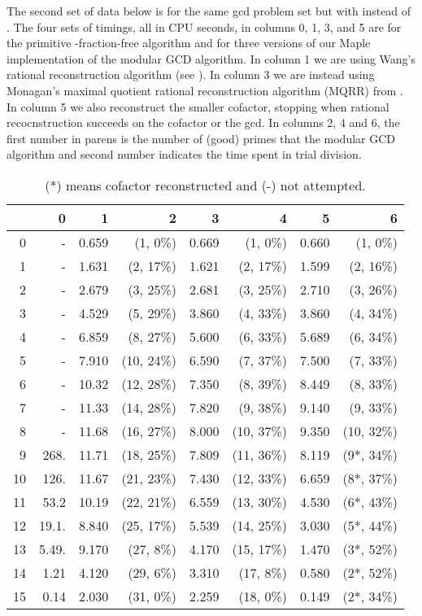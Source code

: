 \documentclass[10pt]{article}
\begin{document}
The second set of data below is for the same gcd problem set but
with  instead of . The four sets of timings, all in CPU
seconds, in columns 0, 1, 3, and 5 are for the primitive
-fraction-free algorithm and for three versions of our Maple
implementation of the modular GCD algorithm. In column 1 we are
using Wang's rational reconstruction algorithm (see \cite{Wang81}).
In column 3 we are instead using Monagan's maximal quotient rational
reconstruction algorithm (MQRR) from \cite{MQRR}. In column 5 we
also reconstruct the smaller cofactor, stopping when rational
recocnstruction succeeds on the cofactor or the gcd. In columns 2, 4
and 6, the first number in parens is the number of (good) primes
that the modular GCD algorithm and second number indicates the time
spent in trial division.

\begin{table}[htb]
\begin{center}
\begin{tabular}{r r | r r | r r | r r}
& 0    &    1  &  2         &    3   &  4         &    5   & 6    \\ \hline
0& -     & 0.659 &(1, 0\%)  &  0.669 &(1, 0\%)   & 0.660 & (1, 0\%)  \\
1& -     & 1.631 &(2, 17\%) &  1.621 &(2, 17\%)  & 1.599 &(2, 16\%)  \\
2& -     & 2.679 &(3, 25\%) &  2.681 &(3, 25\%)  & 2.710 &(3, 26\%)  \\
3& -     & 4.529 &(5, 29\%) &  3.860 &(4, 33\%)  & 3.860 &(4, 34\%)  \\
4& -     & 6.859 &(8, 27\%) &  5.600 &(6, 33\%)  & 5.689 &(6, 34\%)  \\
5& -     & 7.910 &(10, 24\%)&  6.590 &(7, 37\%)  & 7.500 &(7, 33\%)  \\
6& -     & 10.32 &(12, 28\%)&  7.350 &(8, 39\%)  & 8.449 &(8, 33\%)  \\
7& -     & 11.33 &(14, 28\%)&  7.820 &(9, 38\%)  & 9.140 &(9, 33\%)  \\
8& -     & 11.68 &(16, 27\%)&  8.000 &(10, 37\%) & 9.350 &(10, 32\%)  \\
9&  268. & 11.71 &(18, 25\%)&  7.809 &(11, 36\%) & 8.119 &(9*, 34\%)  \\
10& 126. & 11.67 &(21, 23\%)&  7.430 &(12, 33\%) & 6.659 &(8*, 37\%)  \\
11& 53.2 & 10.19 &(22, 21\%)&  6.559 &(13, 30\%) & 4.530 &(6*, 43\%)  \\
12& 19.1.& 8.840 &(25, 17\%)&  5.539 &(14, 25\%) & 3.030 &(5*, 44\%)  \\
13& 5.49.& 9.170 &(27, 8\%) &  4.170 &(15, 17\%) & 1.470 &(3*, 52\%)  \\
14& 1.21 & 4.120 &(29, 6\%) &  3.310 &(17, 8\%)  & 0.580 &(2*, 52\%)  \\
15& 0.14 & 2.030 &(31, 0\%) &  2.259 &(18, 0\%)  & 0.149 &(2*, 34\%)  \\ \hline
\end{tabular}
\caption{(*) means cofactor reconstructed and (-) not attempted.}
\end{center}
\end{table}
\end{document}
